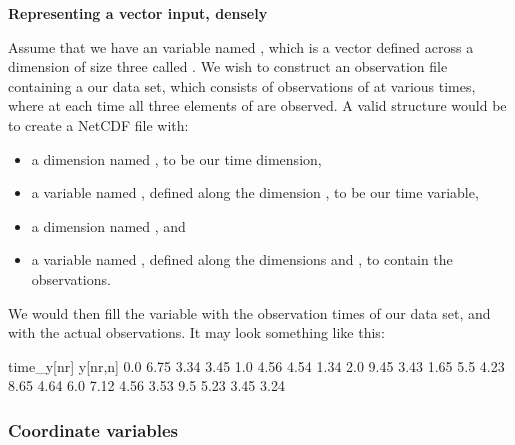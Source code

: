 \begin{example}
\noindent \textbf{Representing a vector input, densely}

Assume that we have an  variable named , which is a vector
defined across a dimension of size three called . We wish to construct
an observation file containing a our data set, which consists of observations
of  at various times, where at each time all three elements of
 are observed. A valid structure would be to create a NetCDF file
with:
\begin{itemize}
\item a dimension named , to be our time dimension,
\item a variable named , defined along the dimension ,
  to be our time variable,
\item a dimension named , and
\item a variable named , defined along the dimensions  and
  , to contain the observations.
\end{itemize}
We would then fill the variable  with the observation times of
our data set, and  with the actual observations. It may look something
like this:

\begin{cmdcode}
time_y[nr]     y[nr,n]
       0.0     6.75 3.34 3.45
       1.0     4.56 4.54 1.34
       2.0     9.45 3.43 1.65
       5.5     4.23 8.65 4.64
       6.0     7.12 4.56 3.53
       9.5     5.23 3.45 3.24
\end{cmdcode}

\end{example}

\subsubsection{Coordinate variables}

